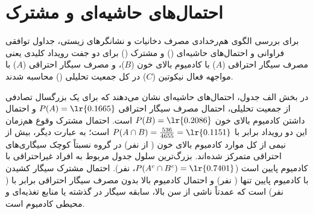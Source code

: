 \documentclass[12pt]{exam}
\begin{document}
\section{احتمال‌های حاشیه‌ای و مشترک}

برای بررسی الگوی هم‌رخدادی مصرف دخانیات و نشانگرهای زیستی، جداول توافقی فراوانی و احتمال‌های حاشیه‌ای () و مشترک () برای دو جفت رویداد کلیدی یعنی مصرف سیگار احتراقی ($A$) با کادمیوم بالای خون ($B$)، و مصرف سیگار احتراقی ($A$) با مواجهه فعال نیکوتین ($C$) در کل جمعیت تحلیلی () محاسبه شدند.

\begin{table}[htbp]
\centering
\caption{جدول فراوانی، احتمال مشترک و احتمال حاشیه‌ای برای جفت رویدادهای $(A, B)$ و $(A, C)$ در جمعیت تحلیلی ()}
\end{table}

در بخش الف جدول، احتمال‌های حاشیه‌ای نشان می‌دهند که برای یک بزرگسال تصادفی از جمعیت تحلیلی، احتمال مصرف سیگار احتراقی $P(A) = \text{\lr{0.1665}}$ و احتمال داشتن کادمیوم بالای خون $P(B) = \text{\lr{0.2086}}$ است. احتمال مشترک وقوع هم‌زمان این دو رویداد برابر با $P(A \cap B) = \frac{536}{4655} = \text{\lr{0.1151}}$ است؛ به عبارت دیگر، بیش از نیمی از کل موارد کادمیوم بالای خون ( از  نفر) در گروه نسبتاً کوچک سیگاری‌های احتراقی متمرکز شده‌اند. بزرگ‌ترین سلول جدول مربوط به افراد غیراحتراقی با کادمیوم پایین است ($P(A^c \cap B^c) = \text{\lr{0.7401}}$،  نفر). احتمال مشترک سیگار کشیدن با کادمیوم پایین تنها  ( نفر) و احتمال کادمیوم بالا بدون مصرف سیگار احتراقی برابر با  ( نفر) است که عمدتاً ناشی از سن بالا، سابقه سیگار در گذشته یا منابع تغذیه‌ای و محیطی کادمیوم است.
\end{document}

